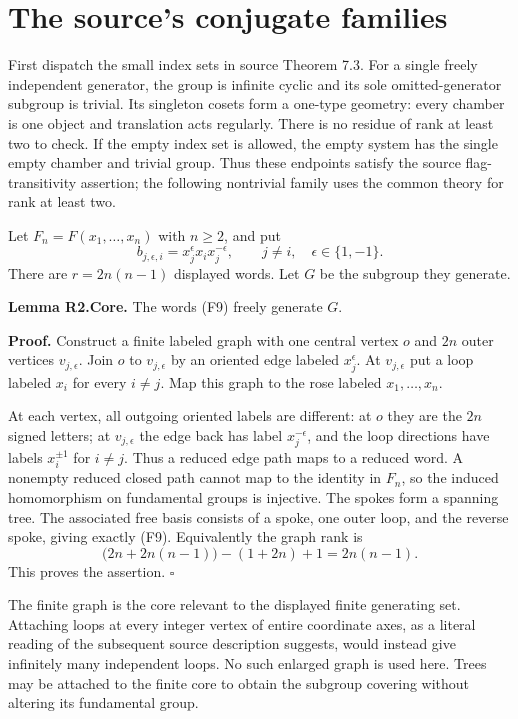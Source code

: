 \section{The source's conjugate
families}\label{the-sources-conjugate-families}

First dispatch the small index sets in source Theorem 7.3. For a single
freely independent generator, the group is infinite cyclic and its sole
omitted-generator subgroup is trivial. Its singleton cosets form a
one-type geometry: every chamber is one object and translation acts
regularly. There is no residue of rank at least two to check. If the
empty index set is allowed, the empty system has the single empty
chamber and trivial group. Thus these endpoints satisfy the source
flag-transitivity assertion; the following nontrivial family uses the
common theory for rank at least two.

Let \(F_n=F(x_1,\ldots,x_n)\) with \(n\ge2\), and put \[
b_{j,\epsilon,i}=x_j^\epsilon x_i x_j^{-\epsilon},
\qquad j\ne i,\quad\epsilon\in\{1,-1\}.
\tag{F9}
\] There are \(r=2n(n-1)\) displayed words. Let \(G\) be the subgroup
they generate.

\textbf{Lemma R2.Core.} The words (F9) freely generate \(G\).

\textbf{Proof.} Construct a finite labeled graph with one central vertex
\(o\) and \(2n\) outer vertices \(v_{j,\epsilon}\). Join \(o\) to
\(v_{j,\epsilon}\) by an oriented edge labeled \(x_j^\epsilon\). At
\(v_{j,\epsilon}\) put a loop labeled \(x_i\) for every \(i\ne j\). Map
this graph to the rose labeled \(x_1,\ldots,x_n\).

At each vertex, all outgoing oriented labels are different: at \(o\)
they are the \(2n\) signed letters; at \(v_{j,\epsilon}\) the edge back
has label \(x_j^{-\epsilon}\), and the loop directions have labels
\(x_i^{\pm1}\) for \(i\ne j\). Thus a reduced edge path maps to a
reduced word. A nonempty reduced closed path cannot map to the identity
in \(F_n\), so the induced homomorphism on fundamental groups is
injective. The spokes form a spanning tree. The associated free basis
consists of a spoke, one outer loop, and the reverse spoke, giving
exactly (F9). Equivalently the graph rank is \[
\bigl(2n+2n(n-1)\bigr)-(1+2n)+1=2n(n-1).
\] This proves the assertion. \(\square\)

The finite graph is the core relevant to the displayed finite generating
set. Attaching loops at every integer vertex of entire coordinate axes,
as a literal reading of the subsequent source description suggests,
would instead give infinitely many independent loops. No such enlarged
graph is used here. Trees may be attached to the finite core to obtain
the subgroup covering without altering its fundamental group.

